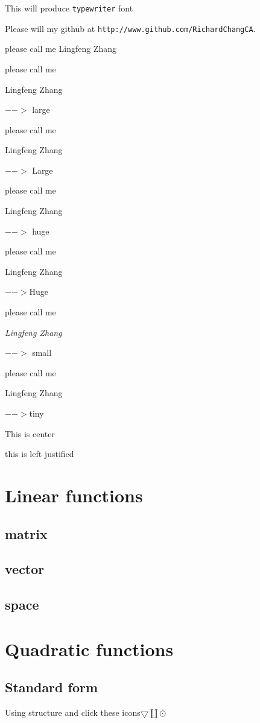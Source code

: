 \documentclass[11pt]{article}
\begin{document}
This will produce \texttt{typewriter} font

Please will my github at \texttt{http://www.github.com/RichardChangCA}.

please call me Lingfeng Zhang

please call me \begin{large}
Lingfeng Zhang
\end{large} $-->$ large

please call me \begin{Large}
Lingfeng Zhang
\end{Large} $-->$ Large

please call me \begin{huge}
Lingfeng Zhang
\end{huge} $-->$ huge

please call me \begin{Huge}
Lingfeng Zhang
\end{Huge} $-->$Huge

please call me \begin{small}
\emph{Lingfeng Zhang}
\end{small}$-->$ small

please call me \begin{tiny}
Lingfeng Zhang
\end{tiny} $-->$tiny

\begin{center}
This is center
\end{center}

\begin{flushleft}
this is left justified
\end{flushleft}

\section{Linear functions}
	\subsection{matrix}
	\subsection{vector}
	\subsection{space}
\section{Quadratic functions}
	\subsection{Standard form}

Using structure and click these icons$\bigtriangledown\amalg\odot$

\end{document}
